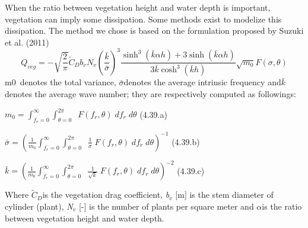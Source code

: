  When the ratio between vegetation height and water depth is important, vegetation can imply some dissipation. Some methods exist  to modelize this dissipation. The method we chose is based on the formulation proposed by Suzuki et al. (2011)
\[Q_{veg} =-\sqrt{\frac{2}{\pi } } \tilde{C}_{D} b_{v} N_{v} \left(\frac{\bar{k}}{\bar{\sigma }} \right)^{3} \frac{\sinh ^{3} (\bar{k}\alpha h)+3\sinh (\bar{k}\alpha h)}{3\bar{k}\cosh ^{3} (\bar{k}h)} \sqrt{m_{0} } F(\sigma ,\theta )\]
m0~denotes the total variance, $\bar{\sigma }$denotes the average intrinsic frequency and$\bar{k}$ denotes the average wave number; they are respectively computed as followings:



$m_{0} =\int _{f_{r} =0}^{\infty }\int _{\theta =0}^{2\pi }\;  \;  F(f_{r} ,\theta )\; df_{r} \; d\theta $ (4.39.a)

$\bar{\sigma }=\left(\frac{1}{m_{0} } \int _{f_{r} =0}^{\infty }\int _{\theta =0}^{2\pi }\;  \; \frac{1}{\sigma } \;  F(f_{r} ,\theta )\; df_{r} \; d\theta \right)^{-1} $ (4.39.b)

$\bar{k}=\left(\frac{1}{m_{0} } \int _{f_{r} =0}^{\infty }\int _{\theta =0}^{2\pi }\;  \; \frac{1}{\sqrt{k} } \;  F(f_{r} ,\theta )\; df_{r} \; d\theta \right)^{-2} $ (4.39.c)

 Where $\tilde{C}_{D} $is the vegetation drag coefficient, \textit{b${}_{v}$} [m] is the stem diameter of cylinder (plant), \textit{N${}_{v}$} [-] is the number of plants per square meter and $\alpha $is the ratio between vegetation height and water depth.


